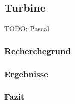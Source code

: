 \subsection{Turbine}

TODO: Pascal

\subsubsection{Recherchegrund}


\subsubsection{Ergebnisse}



\subsubsection{Fazit}

\clearpage 





